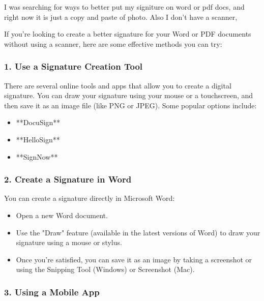 \begin{userprompt}

I was searching for ways to better put my signiture on word or pdf docs, and right now it is just a copy and paste of photo. Also I don't have a scanner,

\end{userprompt}

\begin{botresponse}

If you're looking to create a better signature for your Word or PDF documents without using a scanner, here are some effective methods you can try:

\subsubsection{1. \textbf{Use a Signature Creation Tool}}

There are several online tools and apps that allow you to create a digital signature. You can draw your signature using your mouse or a touchscreen, and then save it as an image file (like PNG or JPEG). Some popular options include:

\begin{itemize}
\item **DocuSign**
\item **HelloSign**
\item **SignNow**
\end{itemize}

\subsubsection{2. \textbf{Create a Signature in Word}}

You can create a signature directly in Microsoft Word:

\begin{itemize}
\item Open a new Word document.
\item Use the "Draw" feature (available in the latest versions of Word) to draw your signature using a mouse or stylus.
\item Once you’re satisfied, you can save it as an image by taking a screenshot or using the Snipping Tool (Windows) or Screenshot (Mac).
\end{itemize}

\subsubsection{3. \textbf{Using a Mobile App}}


\end{botresponse}
